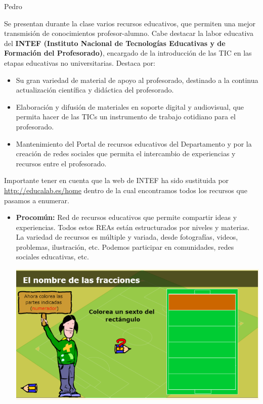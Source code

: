 \begin{opin}{\pedrocolor}{Pedro}

Se presentan durante la clase varios recursos educativos, que permiten una mejor transmisión de conocimientos profesor-alumno. Cabe destacar la labor educativa del  \textbf{INTEF (Instituto Nacional de Tecnologías Educativas y de Formación del Profesorado)}, encargado de la introducción de las TIC en las etapas educativas no universitarias. Destaca por:

\begin{itemize}

\item Su gran variedad de material de apoyo al profesorado, destinado a la continua actualización científica y didáctica del profesorado.
\item Elaboración y difusión de materiales en soporte digital y audiovisual, que permita hacer de las TICs un instrumento de trabajo cotidiano para el profesorado.
\item Mantenimiento del Portal de recursos educativos del Departamento y por la  creación de redes sociales que permita el intercambio de experiencias y recursos entre el profesorado.
\end{itemize}
Importante tener en cuenta que la web de INTEF ha sido sustituida por \url{http://educalab.es/home} dentro de la cual encontramos todos los recursos que pasamos a enumerar.


\begin{itemize}

\item \textbf{ Procomún:} Red de recursos educativos que permite compartir ideas y experiencias. Todos estos REAs están estructurados por niveles y materias. La variedad de recursos es múltiple y variada, desde fotografías, videos, problemas, ilustración, etc. Podemos participar en comunidades, redes sociales educativas, etc. 

\begin{minipage}[hbtp]{1.0\linewidth}
\centering
\includegraphics[scale=0.36]{img/intefpedro1.png}
\end{minipage}


\end{itemize}
\end{opin}
